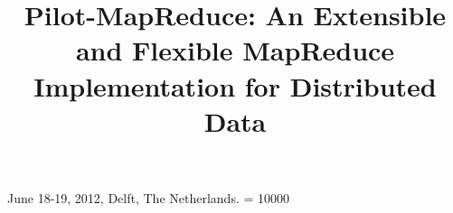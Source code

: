\documentclass{sig-alternate}
\begin{document}
 {June 18-19, 2012, Delft, The Netherlands.} 
\widowpenalty = 10000


\title{Pilot-MapReduce: An Extensible and Flexible
  MapReduce Implementation for Distributed Data}

%
%
%
%
%
\end{document}
